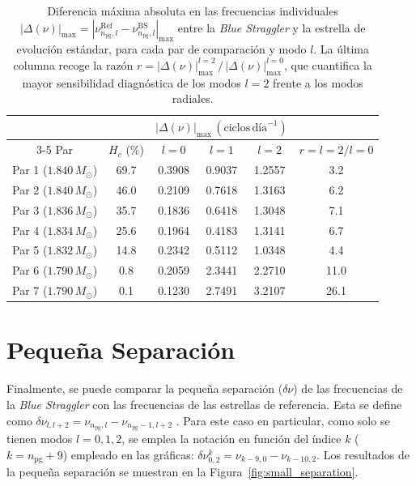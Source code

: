 \begin{table}[H]
  \centering
  \begin{tabular}{
      c
      c
      c
      c
      c
      c
    }
    \toprule
    & & \multicolumn{3}{c}{$|\Delta(\nu)|_\mathrm{max}\,(\text{ciclos}\,\text{día}^{-1})$} & \\
    \cmidrule(lr){3-5}
    {Par} & {$H_c$ (\%)} & {$l = 0$} & {$l = 1$} & {$l = 2$} & {$r = l{=}2/l{=}0$} \\
    \midrule
    Par 1 ($1.840\,M_\odot$) & 69.7 & 0.3908 & 0.9037 & 1.2557 &  3.2 \\
    Par 2 ($1.840\,M_\odot$) & 46.0 & 0.2109 & 0.7618 & 1.3163 &  6.2 \\
    Par 3 ($1.836\,M_\odot$) & 35.7 & 0.1836 & 0.6418 & 1.3048 &  7.1 \\
    Par 4 ($1.834\,M_\odot$) & 25.6 & 0.1964 & 0.4183 & 1.3141 &  6.7 \\
    Par 5 ($1.832\,M_\odot$) & 14.8 & 0.2342 & 0.5112 & 1.0348 &  4.4 \\
    Par 6 ($1.790\,M_\odot$) &  0.8 & 0.2059 & 2.3441 & 2.2710 & 11.0 \\
    Par 7 ($1.790\,M_\odot$) &  0.1 & 0.1230 & 2.7491 & 3.2107 & 26.1 \\
    \bottomrule
  \end{tabular}
  \caption{Diferencia máxima absoluta en las frecuencias individuales $|\Delta(\nu)|_\mathrm{max} = |\nu^{\mathrm{Ref}}_{n_{\mathrm{pg}},l} - \nu^{\mathrm{BS}}_{n_{\mathrm{pg}},l}|_\mathrm{max}$ entre la \textit{Blue Straggler} y la estrella de evolución estándar, para cada par de comparación y modo $l$. La última columna recoge la razón $r = |\Delta(\nu)|_\mathrm{max}^{l=2}\,/\,|\Delta(\nu)|_\mathrm{max}^{l=0}$, que cuantifica la mayor sensibilidad diagnóstica de los modos $l=2$ frente a los modos radiales.}
  \label{tab:max_diff_indfreq}
\end{table}

\section{Pequeña Separación}

Finalmente, se puede comparar la pequeña separación ($\delta \nu$) de las frecuencias de la \textit{Blue Straggler} con las frecuencias de las estrellas de referencia. Esta se define como $\delta\nu_{l, l+2} = \nu_{n_{\mathrm{pg}}, l} - \nu_{n_{\mathrm{pg}}-1, l+2}$ \citep{Cunha2017}. Para este caso en particular, como solo se tienen modos $l=0, 1, 2$, se emplea la notación en función del índice $k$ ($k = n_{\mathrm{pg}} + 9$) empleado en las gráficas: $\delta\nu_{0, 2}^k = \nu_{k-9, 0} - \nu_{k-10, 2}$. Los resultados de la pequeña separación se muestran en la Figura~\ref{fig:small_separation}.

